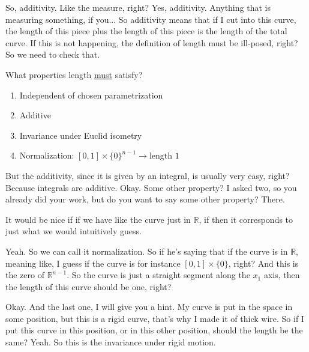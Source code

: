\begin{spoken-clean}[continued]
So, additivity. Like the measure, right? Yes, additivity. Anything that is measuring something, if you... So additivity means that if I cut into this curve, the length of this piece plus the length of this piece is the length of the total curve. If this is not happening, the definition of length must be ill-posed, right? So we need to check that.
\end{spoken-clean}

\begin{math-stroke}
What properties length \underline{must} satisfy?
\begin{enumerate}
    \item Independent of chosen parametrization
    \item Additive
    \item Invariance under Euclid isometry
    \item Normalization: $[0,1]\times\{0\}^{n-1} \to \text{length } 1$
\end{enumerate}
\end{math-stroke}

\begin{spoken-clean}[11:46 - 12:26]
But the additivity, since it is given by an integral, is usually very easy, right? Because integrals are additive. Okay. Some other property? I asked two, so you already did your work, but do you want to say some other property? There.
\end{spoken-clean}

\begin{student-question}
It would be nice if if we have like the curve just in $\mathbb{R}$, if then it corresponds to just what we would intuitively guess.
\end{student-question}

\begin{spoken-clean}[continued]
Yeah. So we can call it normalization. So if he's saying that if the curve is in $\mathbb{R}$, meaning like, I guess if the curve is for instance $[0,1] \times \{0\}$, right? And this is the zero of $\mathbb{R}^{n-1}$. So the curve is just a straight segment along the $x_1$ axis, then the length of this curve should be one, right?
\end{spoken-clean}

\begin{spoken-clean}[12:26 - 13:55]
Okay. And the last one, I will give you a hint. My curve is put in the space in some position, but this is a rigid curve, that's why I made it of thick wire. So if I put this curve in this position, or in this other position, should the length be the same? Yeah. So this is the invariance under rigid motion.
\end{spoken-clean}

